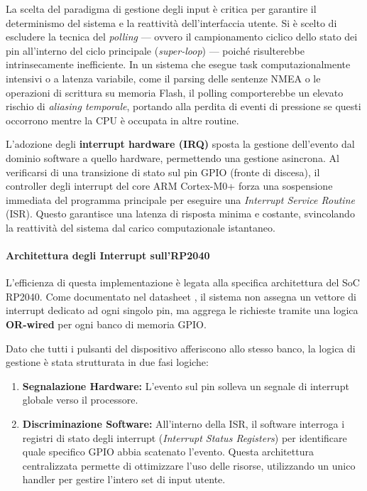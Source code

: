 La scelta del paradigma di gestione degli input è critica per garantire il determinismo del sistema e la reattività dell'interfaccia utente. Si è scelto di escludere la tecnica del \textit{polling} — ovvero il campionamento ciclico dello stato dei pin all'interno del ciclo principale (\textit{super-loop}) — poiché risulterebbe intrinsecamente inefficiente. In un sistema che esegue task computazionalmente intensivi o a latenza variabile, come il parsing delle sentenze NMEA o le operazioni di scrittura su memoria Flash, il polling comporterebbe un elevato rischio di \textit{aliasing temporale}, portando alla perdita di eventi di pressione se questi occorrono mentre la CPU è occupata in altre routine.

L'adozione degli \textbf{interrupt hardware (IRQ)} sposta la gestione dell'evento dal dominio software a quello hardware, permettendo una gestione asincrona. Al verificarsi di una transizione di stato sul pin GPIO (fronte di discesa), il controller degli interrupt del core ARM Cortex-M0+ forza una sospensione immediata del programma principale per eseguire una \textit{Interrupt Service Routine} (ISR). Questo garantisce una latenza di risposta minima e costante, svincolando la reattività del sistema dal carico computazionale istantaneo.



\paragraph{Architettura degli Interrupt sull'RP2040}
L'efficienza di questa implementazione è legata alla specifica architettura del SoC RP2040. Come documentato nel datasheet \cite[\href{https://datasheets.raspberrypi.com/rp2040/rp2040-datasheet.pdf\#page=240}{Sez. 2.19.3}]{rp2040_ds}, il sistema non assegna un vettore di interrupt dedicato ad ogni singolo pin, ma aggrega le richieste tramite una logica \textbf{OR-wired} per ogni banco di memoria GPIO. 

Dato che tutti i pulsanti del dispositivo afferiscono allo stesso banco, la logica di gestione è stata strutturata in due fasi logiche:
\begin{enumerate}
    \item \textbf{Segnalazione Hardware:} L'evento sul pin solleva un segnale di interrupt globale verso il processore.
    \item \textbf{Discriminazione Software:} All'interno della ISR, il software interroga i registri di stato degli interrupt (\textit{Interrupt Status Registers}) per identificare quale specifico GPIO abbia scatenato l'evento. Questa architettura centralizzata permette di ottimizzare l'uso delle risorse, utilizzando un unico handler per gestire l'intero set di input utente.
\end{enumerate}

